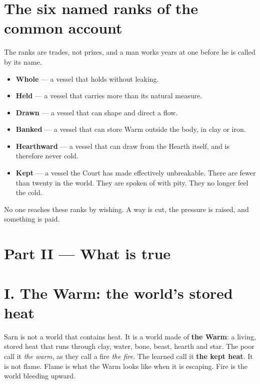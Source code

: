\documentclass{design/chronicle}
\begin{document}
\section*{The six named ranks of the common account}

The ranks are trades, not prizes, and a man works years at one before he is called by its name.

\begin{itemize}[leftmargin=1.4em,itemsep=1pt,topsep=3pt,parsep=0pt]

\item \textbf{Whole} — a vessel that holds without leaking.

\item \textbf{Held} — a vessel that carries more than its natural measure.

\item \textbf{Drawn} — a vessel that can shape and direct a flow.

\item \textbf{Banked} — a vessel that can store Warm outside the body, in clay or iron.

\item \textbf{Hearthward} — a vessel that can draw from the Hearth itself, and is therefore never cold.

\item \textbf{Kept} — a vessel the Court has made effectively unbreakable. There are fewer than twenty in the world. They are spoken of with pity. They no longer feel the cold.

\end{itemize}

No one reaches these ranks by wishing. A way is cut, the pressure is raised, and something is paid.

\CRrule

\section*{Part II — What is true}

\section*{I. The Warm: the world’s stored heat}

Sarn is not a world that contains heat. It is a world made of \textbf{the Warm}: a living, stored heat that runs through clay, water, bone, beast, hearth and star. The poor call it \emph{the warm}, as they call a fire \emph{the fire}. The learned call it \textbf{the kept heat}. It is not flame. Flame is what the Warm looks like when it is escaping. Fire is the world bleeding upward.
\end{document}
